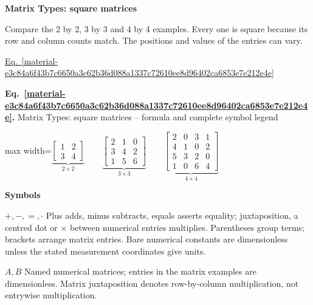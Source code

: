\documentclass[11pt,a4paper]{article}
\begin{document}
\textbf{Matrix Types: square matrices}


Compare the 2 by 2, 3 by 3 and 4 by 4 examples. Every one is square because its row and column counts match. The positions and values of the entries can vary.


\hyperref[material-e3c84a6f43b7c6650a3c62b36d088a1337c72610ee8d96402ca6853e7e212e4e]{Eq.~\ref*{material-e3c84a6f43b7c6650a3c62b36d088a1337c72610ee8d96402ca6853e7e212e4e}}


\par\medskip
\noindent\begin{minipage}{\linewidth}
\label{material-e3c84a6f43b7c6650a3c62b36d088a1337c72610ee8d96402ca6853e7e212e4e}
\noindent\textbf{Eq.~\ref*{material-e3c84a6f43b7c6650a3c62b36d088a1337c72610ee8d96402ca6853e7e212e4e}.} Matrix Types: square matrices – formula and complete symbol legend\par\nopagebreak
\begin{center}\begin{adjustbox}{max width=\linewidth}$\displaystyle \underbrace{\begin{bmatrix}1&2\\3&4\end{bmatrix}}_{2\times2}\qquad\underbrace{\begin{bmatrix}2&1&0\\3&4&2\\1&5&6\end{bmatrix}}_{3\times3}\qquad\underbrace{\begin{bmatrix}2&0&3&1\\4&1&0&2\\5&3&2&0\\1&0&6&4\end{bmatrix}}_{4\times4}$\end{adjustbox}\end{center}

\par\noindent\textbf{Symbols}

\par\noindent\textbf{\(+,-,=,\cdot\)} Plus adds, minus subtracts, equals asserts equality; juxtaposition, a centred dot or \ensuremath{\times} between numerical entries multiplies. Parentheses group terms; brackets arrange matrix entries. Bare numerical constants are dimensionless unless the stated measurement coordinates give units.

\par\noindent\textbf{\(A,B\)} Named numerical matrices; entries in the matrix examples are dimensionless. Matrix juxtaposition denotes row-by-column multiplication, not entrywise multiplication.

\end{minipage}\par
\medskip
\end{document}
